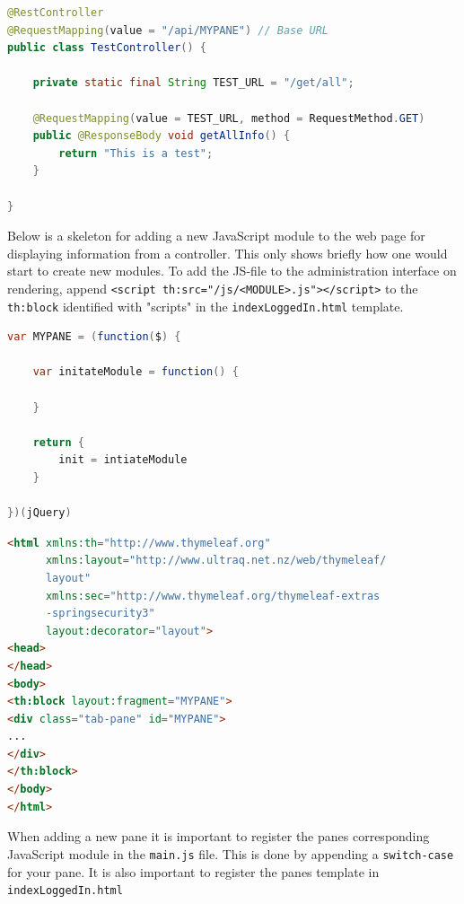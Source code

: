 \begin{lstlisting}[language=Java, captionpos=b, caption=Skeleton for a REST-controller, frame=bt, showstringspaces=false]
@RestController
@RequestMapping(value = "/api/MYPANE") // Base URL
public class TestController() {
    
    private static final String TEST_URL = "/get/all";
    
    @RequestMapping(value = TEST_URL, method = RequestMethod.GET)
    public @ResponseBody void getAllInfo() {
        return "This is a test";
    }
    
}
\end{lstlisting}

Below is a skeleton for adding a new JavaScript module to the web page for displaying information from a controller. This only shows briefly how one would start to create new modules. To add the JS-file to the administration interface on rendering, append \verb!<script th:src="/js/<MODULE>.js"></script>! to the \verb!th:block! identified with "scripts" in the \verb!indexLoggedIn.html! template. \\ 

\begin{lstlisting}[language=Java, captionpos=b, caption=Skeleton for a JavaScript module, frame=bt, showstringspaces=false]
var MYPANE = (function($) { 

    var initateModule = function() {
    
    }

    return {
        init = intiateModule
    }

})(jQuery)
\end{lstlisting}

\begin{lstlisting}[language=HTML, captionpos=b, caption=Skeleton for a Thymeleaf-template, frame=bt, showstringspaces=false]
<html xmlns:th="http://www.thymeleaf.org"
      xmlns:layout="http://www.ultraq.net.nz/web/thymeleaf/
      layout"
      xmlns:sec="http://www.thymeleaf.org/thymeleaf-extras
      -springsecurity3"
      layout:decorator="layout">
<head>
</head>
<body>
<th:block layout:fragment="MYPANE">
<div class="tab-pane" id="MYPANE">
...
</div>
</th:block>
</body>
</html>
\end{lstlisting}

When adding a new pane it is important to register the panes corresponding JavaScript module in the \verb!main.js! file. This is done by appending a \verb!switch-case! for your pane. It is also important to register the panes template in \verb!indexLoggedIn.html!

